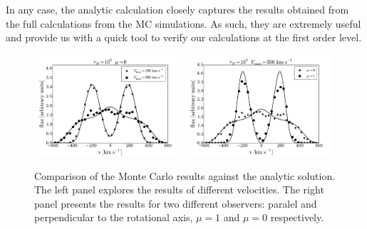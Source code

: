 In any case, the analytic calculation closely captures the results
obtained from the full calculations from the MC simulations.
As such, they are extremely useful and provide us with a quick tool to
verify our calculations at the first order level.
\begin{figure}
\begin{center}
\includegraphics[width=0.49\textwidth]{Figures/fig10a.pdf}
\includegraphics[width=0.49\textwidth]{Figures/fig10b.pdf}
\end{center}
\caption{
Comparison of the Monte Carlo results against the analytic
solution. The left panel explores the results of different velocities.
The right panel presents the results for two different observers:
paralel and perpendicular to the rotational axis, $\mu=1$ and $\mu=0$
respectively.
\label{fig:comparison} }
\end{figure}
